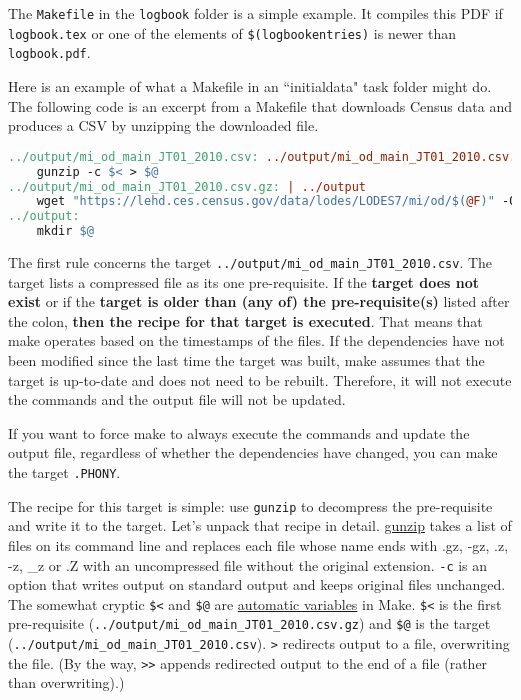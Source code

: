 The \texttt{Makefile} in the \texttt{logbook} folder is a simple example.
It compiles this PDF if \texttt{logbook.tex} or one of the elements of \texttt{\$(logbookentries)} is newer than \texttt{logbook.pdf}.

Here is an example of what a Makefile in an ``initialdata" task folder might do.
The following code is an excerpt from a Makefile that downloads Census data and produces a CSV by unzipping the downloaded file.
\begin{lstlisting}[language=make]
../output/mi_od_main_JT01_2010.csv: ../output/mi_od_main_JT01_2010.csv.gz
	gunzip -c $< > $@
../output/mi_od_main_JT01_2010.csv.gz: | ../output
	wget "https://lehd.ces.census.gov/data/lodes/LODES7/mi/od/$(@F)" -O ../output/$(@F)
../output:
	mkdir $@
\end{lstlisting}
The first rule concerns the target \texttt{../output/mi\_od\_main\_JT01\_2010.csv}.
The target lists a compressed file as its one pre-requisite.
If the \textbf{target does not exist} or if the \textbf{target is older than (any of) the pre-requisite(s)} listed after the colon,
\textbf{then the recipe for that target is executed}. That means that make operates based on the timestamps of the files. If the dependencies have not been modified since the last time the target was built, 
make assumes that the target is up-to-date and does not need to be rebuilt. Therefore, it will not execute the commands and the output file will not be updated.

If you want to force make to always execute the commands and update the output file, regardless of whether the dependencies have changed, you can make the target \texttt{.PHONY}.

The recipe for this target is simple: use \texttt{gunzip} to decompress the pre-requisite and write it to the target.
Let's unpack that recipe in detail.
\href{https://linux.die.net/man/1/gunzip}{gunzip} takes a list of files on its command line and replaces each file whose name ends with .gz, -gz, .z, -z, \_z or .Z with an uncompressed file without the original extension.
\texttt{-c} is an option that writes output on standard output and keeps original files unchanged.
The somewhat cryptic \texttt{\$<} and \texttt{\$@} are \href{https://www.gnu.org/software/make/manual/html_node/Automatic-Variables.html}{automatic variables} in Make.
\texttt{\$<} is the first pre-requisite (\texttt{../output/mi\_od\_main\_JT01\_2010.csv.gz})
and
\texttt{\$@} is the target (\texttt{../output/mi\_od\_main\_JT01\_2010.csv}).
\texttt{>} redirects output to a file, overwriting the file.
(By the way, \texttt{>>} appends redirected output to the end of a file (rather than overwriting).)

